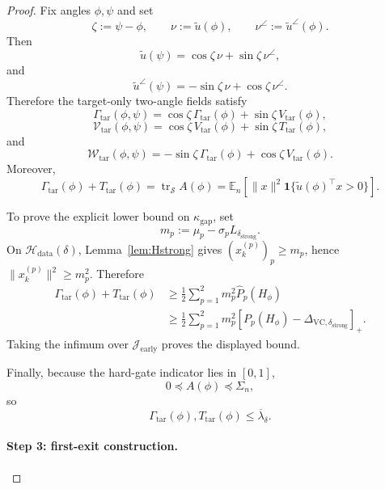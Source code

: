 \documentclass{article} %
\theoremstyle{plain}
\theoremstyle{definition}
\theoremstyle{remark}
\begin{document}
\begin{proof}
Fix angles $\phi,\psi$ and set
\[
\zeta:=\psi-\phi,
\qquad
\nu:=\widetilde u(\phi),
\qquad
\nu^\angle:=\widetilde u^\angle(\phi).
\]
Then
\[
\widetilde u(\psi)
=
\cos\zeta\,\nu
+
\sin\zeta\,\nu^\angle,
\]
and
\[
\widetilde u^\angle(\psi)
=
-\sin\zeta\,\nu
+
\cos\zeta\,\nu^\angle.
\]
Therefore the target-only two-angle fields satisfy
\[
\boxed{
\Gamma_{\mathrm{tar}}(\phi,\psi)
=
\cos\zeta\,\Gamma_{\mathrm{tar}}(\phi)
+
\sin\zeta\,V_{\mathrm{tar}}(\phi),
}
\]
\[
\boxed{
\mathcal V_{\mathrm{tar}}(\phi,\psi)
=
\cos\zeta\,V_{\mathrm{tar}}(\phi)
+
\sin\zeta\,T_{\mathrm{tar}}(\phi),
}
\]
and
\[
\boxed{
\mathcal W_{\mathrm{tar}}(\phi,\psi)
=
-\sin\zeta\,\Gamma_{\mathrm{tar}}(\phi)
+
\cos\zeta\,V_{\mathrm{tar}}(\phi).
}
\]
Moreover,
\[
\boxed{
\Gamma_{\mathrm{tar}}(\phi)
+
T_{\mathrm{tar}}(\phi)
=
\operatorname{tr}_{\mathcal S}A(\phi)
=
\mathbb E_n
\left[
\|x\|^2
\mathbf 1\{\widetilde u(\phi)^\top x>0\}
\right].
}
\]

To prove the explicit lower bound on $\kappa_{\mathrm{gap}}$, set
\[
m_p:=\mu_p-\sigma_pL_{\delta_{\mathrm{strong}}}.
\]
On $\mathcal H_{\mathrm{data}}(\delta)$,
Lemma~\ref{lem:Hstrong} gives
$(x_k^{(p)})_p\ge m_p$, hence
$\|x_k^{(p)}\|^2\ge m_p^2$.  Therefore
\[
\begin{aligned}
\Gamma_{\mathrm{tar}}(\phi)+T_{\mathrm{tar}}(\phi)
&\ge
\frac12\sum_{p=1}^2
m_p^2\widehat P_p(H_\phi)
\\
&\ge
\frac12\sum_{p=1}^2
m_p^2
\left[
P_p(H_\phi)-\Delta_{\mathrm{VC},\delta_{\mathrm{strong}}}
\right]_+.
\end{aligned}
\]
Taking the infimum over $\mathcal J_{\mathrm{early}}$ proves the displayed
bound.

Finally, because the hard-gate indicator lies in $[0,1]$,
\[
0\preceq A(\phi)\preceq\Sigma_n,
\]
so
\[
\Gamma_{\mathrm{tar}}(\phi),
T_{\mathrm{tar}}(\phi)
\le
\overline\lambda_\delta.
\]

\paragraph{Step 3: first-exit construction.}


\end{proof}
\end{document}
